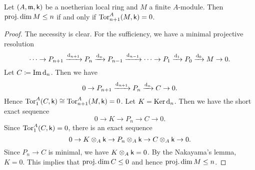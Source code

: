         \begin{lemma}\label{lem: tor control the projective dimension}
        Let \((A,{\mathfrak{m}},{\mathsf{k}})\) be a noetherian local ring and \(M\) a finite \(A\)-module.
        Then \(\operatorname{proj.dim} M \leq n\) if and only if \(\operatorname{Tor}_{n+1}^A(M,{\mathsf{k}}) = 0\).
    \end{lemma}
    \begin{proof}
        The necessity is clear.
        For the sufficiency, we have a minimal projective resolution
        \[ \cdots \to P_{n+1} \xrightarrow{{\mathrm{d}}_{n+1}} P_n \xrightarrow{{\mathrm{d}}_n} P_{n-1} \xrightarrow{{\mathrm{d}}_{n-1}} \cdots \to P_1 \xrightarrow{{\mathrm{d}}_1} P_0 \xrightarrow{{\mathrm{d}}_0} M \to 0. \]
        Let \(C \coloneqq \operatorname{Im} {\mathrm{d}}_n\).
        Then we have 
        \[ 0 \to P_{n+1} \xrightarrow{{\mathrm{d}}_{n+1}} P_n \xrightarrow{{\mathrm{d}}_n} C \to 0. \]
        Hence \(\operatorname{Tor}_{1}^A(C,{\mathsf{k}}) \cong \operatorname{Tor}_{n+1}^A(M,{\mathsf{k}}) = 0\).
        Let \(K = \operatorname{Ker} {\mathrm{d}}_n\).
        Then we have the short exact sequence
        \[ 0 \to K \to P_n \to C \to 0. \]
        Since \(\operatorname{Tor}_{1}^A(C,{\mathsf{k}}) = 0\), there is an exact sequence
        \[ 0 \to K \otimes_A {\mathsf{k}} \to P_n \otimes_A {\mathsf{k}} \to C \otimes_A {\mathsf{k}} \to 0. \]
        Since \(P_n \to C\) is minimal, we have \(K \otimes_A {\mathsf{k}} = 0\).
        By the Nakayama's lemma, \(K = 0\).
        This implies that \( \operatorname{proj.dim} C \leq 0\) and hence \(\operatorname{proj.dim} M \leq n\).
    \end{proof}

        

